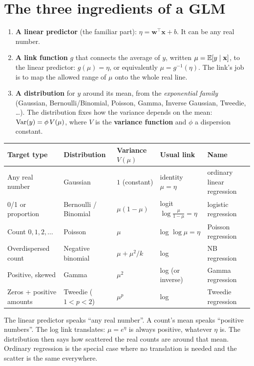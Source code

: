 \section{The three ingredients of a GLM}

\begin{enumerate}
\item \textbf{A linear predictor} (the familiar part): $\eta = \mathbf w^\top\mathbf x + b$. It can be any real number.
\item \textbf{A link function} $g$ that connects the average of $y$, written $\mu = \mathbb{E}[y\mid\mathbf x]$, to the linear
  predictor: $g(\mu) = \eta$, or equivalently $\mu = g^{-1}(\eta)$. The link's job is to map the allowed range of $\mu$
  onto the whole real line.
\item \textbf{A distribution} for $y$ around its mean, from the \emph{exponential family} (Gaussian, Bernoulli/Binomial,
  Poisson, Gamma, Inverse Gaussian, Tweedie, \dots). The distribution fixes how the variance depends on the mean:
  $\operatorname{Var}(y) = \phi\,V(\mu)$, where $V$ is the \textbf{variance function} and $\phi$ a dispersion constant.
\end{enumerate}

\begin{center}\small
\begin{tabularx}{\linewidth}{l l l l X}
\toprule
Target type & Distribution & Variance $V(\mu)$ & Usual link & Name\\
\midrule
Any real number & Gaussian & $1$ (constant) & identity $\mu = \eta$ & ordinary linear regression\\
0/1 or proportion & Bernoulli / Binomial & $\mu(1-\mu)$ & logit $\log\frac{\mu}{1-\mu} = \eta$ & logistic regression\\
Count $0,1,2,\dots$ & Poisson & $\mu$ & log $\log\mu = \eta$ & Poisson regression\\
Overdispersed count & Negative binomial & $\mu + \mu^2/k$ & log & NB regression\\
Positive, skewed & Gamma & $\mu^2$ & log (or inverse) & Gamma regression\\
Zeros + positive amounts & Tweedie ($1<p<2$) & $\mu^p$ & log & Tweedie regression\\
\bottomrule
\end{tabularx}
\end{center}

\begin{intuition}
The linear predictor speaks ``any real number''. A count's mean speaks ``positive numbers''. The log link translates:
$\mu = e^\eta$ is always positive, whatever $\eta$ is. The distribution then says how scattered the real counts are
around that mean. Ordinary regression is the special case where no translation is needed and the scatter is the same
everywhere.
\end{intuition}

